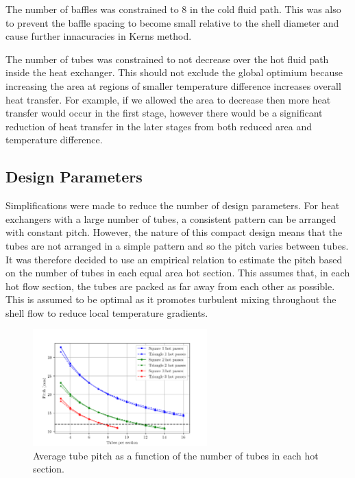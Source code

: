 \documentclass{article}
\begin{document}
The number of baffles was constrained to 8 in the cold fluid path. %
This was also to prevent the baffle spacing to become small relative to the shell diameter and cause further
innacuracies in Kerns method.

The number of tubes was constrained to not decrease over the hot fluid path inside the heat exchanger.
This should not exclude the global optimium because increasing the area at regions of smaller temperature difference increases overall heat transfer.
For example, if we allowed the area to decrease then more heat transfer would occur in the first stage,
however there would be a significant reduction of heat transfer in the later stages from both reduced area and temperature difference.

\subsection{Design Parameters}

Simplifications were made to reduce the number of design parameters.
For heat exchangers with a large number of tubes, a consistent pattern can be arranged with constant pitch.
However, the nature of this compact design means that the tubes are not arranged in a simple pattern and so the pitch varies between tubes.
It was therefore decided to use an empirical relation to estimate the pitch based on the number of tubes in each equal area hot section.
This assumes that, in each hot flow section, the tubes are packed as far away from each other as possible.
This is assumed to be optimal as it promotes turbulent mixing throughout the shell flow to reduce local temperature gradients.

\begin{figure}[H]
  \centering
  \includegraphics[width=0.6\textwidth]{pitch_vs_tubes.png}
  \caption{Average tube pitch as a function of the number of tubes in each hot section.}
  \label{fig:pitch_vs_tubes}
\end{figure}
\end{document}
